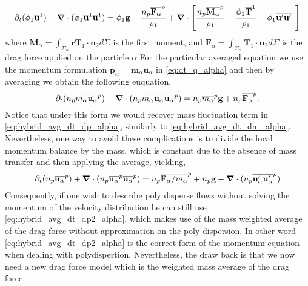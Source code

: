 \begin{equation}
     \partial_t (\phi_1\overline{\textbf{u}}^1)
    +  \bm{\nabla} \cdot (\phi_1\overline{\textbf{u}}^1 \overline{\textbf{u}}^1)
    = 
     \phi_1 \textbf{g}
    - \frac{n_p\overline{\textbf{F}_\alpha}^{p}}{\rho_1} 
    +  \bm{\nabla} \cdot \left[
        \frac{n_p\overline{\textbf{M}_\alpha}^{p}}{\rho_1}
        +\frac{\phi_1\overline{ \textbf{T}}^1}{\rho_1}
        -  \phi_1\overline{\textbf{u}'\textbf{u}'}^1
    \right]
    \label{eq:hybrid_avg_dt_rhou}
\end{equation}
where $\textbf{M}_\alpha = \int_{\Sigma_\alpha} \textbf{r}
\mathbf{T}_1
\cdot \textbf{n}_2d\Sigma $
is the first moment,
and $\textbf{F}_\alpha = \int_{\Sigma_\alpha}
\mathbf{T}_1
\cdot \textbf{n}_2d\Sigma$ is the drag force applied on the particle $\alpha$
For the particular averaged equation we use the momentum formulation $\textbf{p}_\alpha = \textbf{m}_\alpha \textbf{u}_\alpha$ in \ref{eq:dt_q_alpha} and then by averaging we obtain the following euquation,
\begin{equation}
    \partial_t (n_p\overline{m_\alpha\textbf{u}_\alpha}^{p})
    + \bm{\nabla} \cdot(n_p\overline{m_\alpha \textbf{u}_\alpha \textbf{u}_\alpha }^{p})
    = n_p\overline{m_\alpha}^{p}\textbf{g}
    + n_p\overline{\textbf{F}_\alpha}^{p}.
    \label{eq:hybrid_avg_dt_dp_alpha}\\
\end{equation}
Notice that under this form we would recover mass fluctuation term in  \ref{eq:hybrid_avg_dt_dp_alpha}, similarly to \ref{eq:hybrid_avg_dt_dm_alpha}. 
Nevertheless, one way to avoid these complications is to divide the local momentum balance by the mass, which is constant due to the absence of mass transfer and then applying the average, yielding, 
\begin{equation}
    \partial_t (n_p\overline{\textbf{u}_\alpha}^{p})
    + \bm{\nabla} \cdot(n_p\overline{\textbf{u}_\alpha}^{p}\overline{ \textbf{u}_\alpha }^{p})
    = 
    n_p\overline{\textbf{F}_\alpha/m_\alpha}^{p}
    + n_p \textbf{g}
    - \bm{\nabla} \cdot(n_p\overline{\textbf{u}'_\alpha \textbf{u}'_\alpha }^{p})
    \label{eq:hybrid_avg_dt_dp2_alpha}
\end{equation}
Consequently, if one wish to describe poly disperse flows without solving the momentum of the velocity distribution he can still use \ref{eq:hybrid_avg_dt_dp2_alpha}, which makes use of the mass weighted average of the drag force without approximation on the poly dispersion. 
In other word \ref{eq:hybrid_avg_dt_dp2_alpha} is the correct form of the momentum equation when dealing with polydispertion. 
Nevertheless, the draw back is that we now need a new drag force model which is the weighted mass average of the drag force. 


